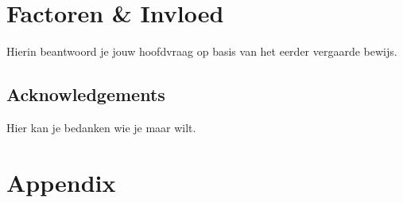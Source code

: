\newpage
\section{Factoren & Invloed}
\label{sec:conc}

Hierin beantwoord je jouw hoofdvraag op basis van het eerder vergaarde bewijs.



\subsection{Acknowledgements}
Hier kan je bedanken wie je maar wilt.

\newpage
\section{Appendix}